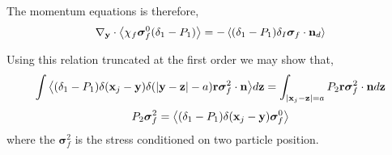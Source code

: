 {The momentum equations is therefore, 
\begin{equation*}
    {\mathbf{\nabla}_\textbf{y}}\cdot \left<\chi_f \bm\sigma^0_f (\delta_1 - P_1)\right>
    = - \left<(\delta_1 - P_1)\delta_I \bm\sigma_f \cdot \textbf{n}_d\right>
\end{equation*}

Using this relation truncated at the first order we may show that, 
\begin{equation*}
    \int{\left<(\delta_1 - P_1) \delta(\textbf{x}_j - \textbf{y})\delta(|\textbf{y} - \textbf{z}| - a)\textbf{r}\bm\sigma_f^2\cdot \textbf{n} \right>}d\textbf{z}
    = 
    \int_{|\textbf{x}_j - \textbf{z}| = a} P_2 \textbf{r}\bm\sigma_f^2\cdot \textbf{n} d\textbf{z}
\end{equation*}
\begin{equation*}
    P_2 \bm\sigma_f^2 = 
    \left<(\delta_1 - P_1) \delta(\textbf{x}_j - \textbf{y})\bm\sigma_f^0\right>
\end{equation*}
where the $\bm\sigma_f^2$ is the stress conditioned on two particle position. 
}